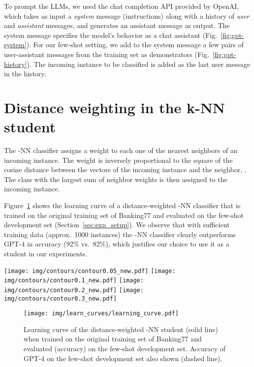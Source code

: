 \documentclass[11pt]{article}
\begin{document}
To prompt the LLMs, we used the chat completion API provided by OpenAI, which takes as input a \emph{system} message (instructions) along with a history of \emph{user} and \emph{assistant} messages, and generates an assistant message as output. The system message specifies the model's behavior as a chat assistant (Fig.~\ref{fig:gpt-system}). For our few-shot setting, we add to the system message a few pairs of user-assistant messages from the training set as demonstrators (Fig.~\ref{fig:gpt-history}). The incoming instance to be classified is added as the last user message in the history.

\section{Distance weighting in the k-NN student}
\label{sec:knn_details}
\label{sec:learning_curves}

The -NN classifier assigns a weight to each one of the  nearest neighbors of an incoming instance. The weight is inversely proportional to the square of the cosine distance between the vectors of the incoming instance and the neighbor,  . The class with the largest sum of neighbor weights is then assigned to the incoming instance. 

Figure~\ref{fig:lrc} shows the learning curve of a distance-weighted -NN classifier that is trained on the original training set of Banking77  and evaluated on the few-shot development set (Section~\ref{sec:exp_setup}). We observe that with sufficient training data (approx.\ 1000 instances) the -NN classifier clearly outperforms GPT-4 in accuracy (92\% vs.\ 82\%), which justifies our choice to use it as a student in our experiments. 

\begin{figure*}[tb]
\centering 
    \texttt{[image: img/contours/contour0.05\_new.pdf]}
    \texttt{[image: img/contours/contour0.1\_new.pdf]}
    \texttt{[image: img/contours/contour0.2\_new.pdf]}
    \texttt{[image: img/contours/contour0.3\_new.pdf]}
    \vspace{-2mm}    
    \caption{Contour plots (discounted accuracy) obtained during threshold tuning in the main experiments (GPT-4 teacher, -NN student, Banking 77 data), for various  values.}
    \label{fig:contours}
\end{figure*}


\begin{figure}[ht]
    \centering
    \vspace{-1pt} 
    
    \texttt{[image: img/learn\_curves/learning\_curve.pdf]}
    \caption{Learning curve of the distance-weighted -NN student (solid line) when trained on the original training set of Banking77 and evaluated (accuracy) on the few-shot development set. Accuracy of GPT-4 on the few-shot development set also shown (dashed line).}
    \label{fig:lrc}
    \vspace{-1em}
\end{figure}
\end{document}
